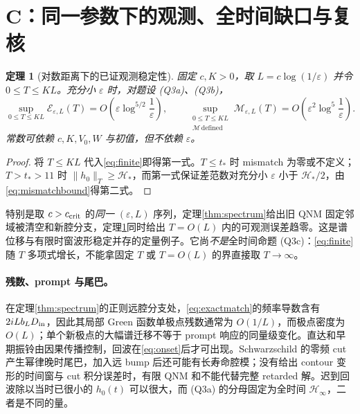 \documentclass[UTF8,a4paper,11pt]{ctexart}
\newtheorem{theorem}{定理}
\newcommand{\ee}{\varepsilon}
\newcommand{\HH}{\mathcal H}
\begin{document}
\section{C：同一参数下的观测、全时间缺口与复核}
\begin{theorem}[对数距离下的已证观测稳定性]\label{thm:log}
固定 $c,K>0$，取 $L=c\log(1/\ee)$ 并令 $0\leq T\leq KL$。充分小 $\ee$ 时，对题设 (Q3a)、(Q3b)，
\begin{equation}\label{eq:logwindow}
 \sup_{0\leq T\leq KL}\mathcal E_{\ee,L}(T)
 =O\!\left(\ee\log^{5/2}\frac1\ee\right),
\qquad
 \sup_{\substack{0\leq T\leq KL\\\mathcal M\,\mathrm{defined}}}
 \mathcal M_{\ee,L}(T)
 =O\!\left(\ee^2\log^5\frac1\ee\right).
\end{equation}
常数可依赖 $c,K,V_0,W$ 与初值，但不依赖 $\ee$。
\end{theorem}
\begin{proof}
将 $T\leq KL$ 代入\eqref{eq:finite}即得第一式。$T\leq t_*$ 时 mismatch 为零或不定义；$T>t_*>11$ 时 $\|h_0\|_T\geq\HH_*$，而第一式保证差范数对充分小 $\ee$ 小于 $\HH_*/2$，由\eqref{eq:mismatchbound}得第二式。
\end{proof}

特别是取 $c>c_{\rm crit}$ 的\emph{同一} $(\ee,L)$ 序列，定理\ref{thm:spectrum}给出旧 QNM 固定邻域被清空和新腔分支，定理\ref{thm:log}同时给出 $T=O(L)$ 内的可观测误差趋零。这是谱位移与有限时窗波形稳定并存的定量例子。它尚\emph{不是}全时间命题 (Q3c)：\eqref{eq:finite}随 $T$ 多项式增长，不能拿固定 $T$ 或 $T=O(L)$ 的界直接取 $T\to\infty$。

\paragraph{残数、prompt 与尾巴。}
在定理\ref{thm:spectrum}的正则远腔分支处，\eqref{eq:exactmatch}的频率导数含有 $2iL b_LD_{\rm in}$，因此其局部 Green 函数单极点残数通常为 $O(1/L)$，而极点密度为 $O(L)$；单个新极点的大幅谱迁移不等于 prompt 响应的同量级变化。直达和早期振铃由因果传播控制，回波在\eqref{eq:onset}后才可出现。Schwarzschild 的零频 cut 产生幂律晚时尾巴\cite{DSS,ABW}，加入远 bump 后还可能有长寿命腔模；没有给出 contour 变形的时间窗与 cut 积分误差时，有限 QNM 和不能代替完整 retarded 解。迟到回波除以当时已很小的 $h_0(t)$ 可以很大，而 (Q3a) 的分母固定为全时间 $\HH_\infty$，二者是不同的量。
\end{document}
